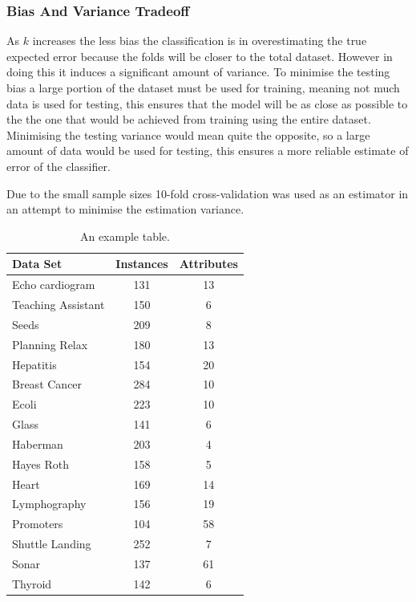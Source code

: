 \documentclass{cmppgr}
\begin{document}
\subsubsection{Bias And Variance Tradeoff}
As $k$ increases the less bias the classification is in overestimating the true expected error because the folds will be closer to the total dataset. However in doing this it induces a significant amount of variance. To minimise the testing bias a large portion of the dataset must be used for training, meaning not much data is used for testing, this ensures that the model will be as close as possible to the the one that would be achieved from training using the entire dataset. Minimising the testing variance would mean quite the opposite, so a large amount of data would be used for testing, this ensures a more reliable estimate of error of the classifier.

 

Due to the small sample sizes 10-fold cross-validation was used as an estimator in an attempt to minimise the estimation variance.


\begin{table}[h]
	\centering
	\caption{An example table.}
	\begin{tabular}{|l|c|c|}
		\hline
		Data Set & Instances & Attributes \\\hline\hline
		Echo cardiogram & 131 & 13\\
		Teaching Assistant & 150 & 6\\
		Seeds & 209 & 8\\
		Planning Relax & 180 & 13\\
	    Hepatitis & 154 & 20\\
		Breast Cancer & 284 & 10\\
		Ecoli & 223 &10 \\
		Glass & 141 &6  \\
		Haberman & 203  &4 \\
		Hayes Roth & 158 &5 \\
		Heart & 169 & 14\\
		Lymphography & 156 &19 \\
		Promoters & 104 &58  \\
		Shuttle Landing & 252  &7 \\
		Sonar & 137 &61 \\
		Thyroid & 142 & 6\\\hline
	\end{tabular}
	\label{tab:example}
\end{table}
\end{document}
